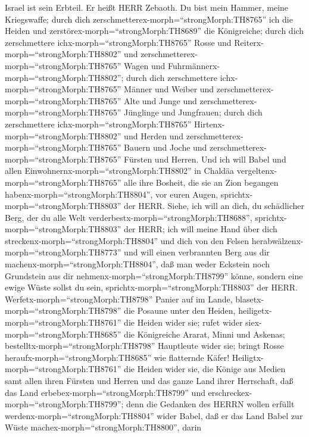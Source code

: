 Israel ist sein Erbteil. Er heißt HERR Zebaoth.  Du bist
mein Hammer, meine Kriegswaffe; durch dich
zerschmetterex-morph=``strongMorph:TH8765'' ich die Heiden und
zerstörex-morph=``strongMorph:TH8689'' die Königreiche; 
durch dich zerschmettere ichx-morph=``strongMorph:TH8765'' Rosse und
Reiterx-morph=``strongMorph:TH8802'' und
zerschmetterex-morph=``strongMorph:TH8765'' Wagen und
Fuhrmännerx-morph=``strongMorph:TH8802'';  durch dich
zerschmettere ichx-morph=``strongMorph:TH8765'' Männer und Weiber und
zerschmetterex-morph=``strongMorph:TH8765'' Alte und Junge und
zerschmetterex-morph=``strongMorph:TH8765'' Jünglinge und Jungfrauen;
 durch dich zerschmettere ichx-morph=``strongMorph:TH8765''
Hirtenx-morph=``strongMorph:TH8802'' und Herden und
zerschmetterex-morph=``strongMorph:TH8765'' Bauern und Joche und
zerschmetterex-morph=``strongMorph:TH8765'' Fürsten und Herren.
 Und ich will Babel und allen
Einwohnernx-morph=``strongMorph:TH8802'' in Chaldäa
vergeltenx-morph=``strongMorph:TH8765'' alle ihre Bosheit, die sie an
Zion begangen habenx-morph=``strongMorph:TH8804'', vor euren Augen,
sprichtx-morph=``strongMorph:TH8803'' der HERR.  Siehe, ich
will an dich, du schädlicher Berg, der du alle Welt
verderbestx-morph=``strongMorph:TH8688'',
sprichtx-morph=``strongMorph:TH8803'' der HERR; ich will meine Hand über
dich streckenx-morph=``strongMorph:TH8804'' und dich von den Felsen
herabwälzenx-morph=``strongMorph:TH8773'' und will einen verbrannten
Berg aus dir machenx-morph=``strongMorph:TH8804'',  daß man
weder Eckstein noch Grundstein aus dir
nehmenx-morph=``strongMorph:TH8799'' könne, sondern eine ewige Wüste
sollst du sein, sprichtx-morph=``strongMorph:TH8803'' der HERR.
 Werfetx-morph=``strongMorph:TH8798'' Panier auf im Lande,
blasetx-morph=``strongMorph:TH8798'' die Posaune unter den Heiden,
heiligetx-morph=``strongMorph:TH8761'' die Heiden wider sie; rufet wider
siex-morph=``strongMorph:TH8685'' die Königreiche Ararat, Minni und
Askenas; bestelltx-morph=``strongMorph:TH8798'' Hauptleute wider sie;
bringt Rosse heraufx-morph=``strongMorph:TH8685'' wie flatternde Käfer!
 Heiligtx-morph=``strongMorph:TH8761'' die Heiden wider
sie, die Könige aus Medien samt allen ihren Fürsten und Herren und das
ganze Land ihrer Herrschaft,  daß das Land
erbebex-morph=``strongMorph:TH8799'' und
erschreckex-morph=``strongMorph:TH8799''; denn die Gedanken des HERRN
wollen erfüllt werdenx-morph=``strongMorph:TH8804'' wider Babel, daß er
das Land Babel zur Wüste machex-morph=``strongMorph:TH8800'', darin
